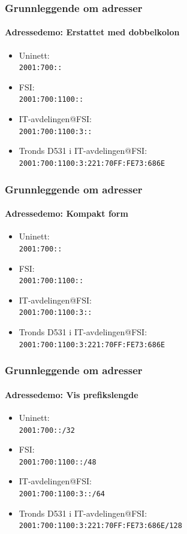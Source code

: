 \begin{frame}%
  \frametitle{Grunnleggende om adresser}
  \framesubtitle{Adressedemo: Erstattet med dobbelkolon}
  \begin{itemize}%
  \item Uninett:\\\texttt{2001:700\alert{::}\phantom{/32}}
  \item FSI:\\\texttt{2001:700:1100\alert{::}\phantom{/48}}
  \item IT-avdelingen@FSI:\\\texttt{2001:700:1100:3\alert{::}\phantom{/64}}
  \item Tronds D531 i IT-avdelingen@FSI:\\\texttt{2001:700:1100:3:221:70FF:FE73:686E\phantom{/128}}
  \end{itemize}
\end{frame}

\begin{frame}%
  \frametitle{Grunnleggende om adresser}
  \framesubtitle{Adressedemo: Kompakt form}
  \begin{itemize}%
  \item Uninett:\\\texttt{2001:700::\phantom{/32}}
  \item FSI:\\\texttt{2001:700:1100::\phantom{/48}}
  \item IT-avdelingen@FSI:\\\texttt{2001:700:1100:3::\phantom{/64}}
  \item Tronds D531 i IT-avdelingen@FSI:\\\texttt{2001:700:1100:3:221:70FF:FE73:686E\phantom{/128}}
  \end{itemize}
\end{frame}

\begin{frame}%
  \frametitle{Grunnleggende om adresser}
  \framesubtitle{Adressedemo: Vis prefikslengde}
  \begin{itemize}%
  \item Uninett:\\\texttt{2001:700::\alert{/32}}
  \item FSI:\\\texttt{2001:700:1100::\alert{/48}}
  \item IT-avdelingen@FSI:\\\texttt{2001:700:1100:3::\alert{/64}}
  \item Tronds D531 i IT-avdelingen@FSI:\\\texttt{2001:700:1100:3:221:70FF:FE73:686E\alert{/128}}
  \end{itemize}
\end{frame}

